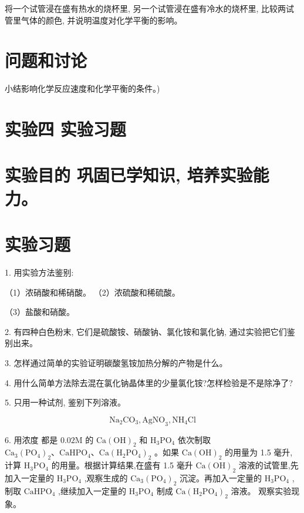 \documentclass[10pt]{article}
\begin{document}
将一个试管浸在盛有热水的烧杯里, 另一个试管浸在盛有冷水的烧杯里, 比较两试管里气体的颜色, 并说明温度对化学平衡的影响。

\section*{问题和讨论}

小结影响化学反应速度和化学平衡的条件。)

\section*{实验四 实验习题}

\section*{实验目的 巩固已学知识, 培养实验能力。}

\section*{实验习题}

1. 用实验方法鉴别:

（1）浓硝酸和稀硝酸。 （2）浓硫酸和稀硫酸。

（3）盐酸和硝酸。

2. 有四种白色粉末, 它们是硫酸铵、硝酸钠、氯化铵和氯化钠, 通过实验把它们鉴别出来。

3. 怎样通过简单的实验证明碳酸氢铵加热分解的产物是什么。

4. 用什么简单方法除去混在氯化钠晶体里的少量氯化铵?怎样检验是不是除净了?

5. 只用一种试剂, 鉴别下列溶液。

\[
{\mathrm{{Na}}}_{2}{\mathrm{{CO}}}_{3},{\mathrm{{AgNO}}}_{3},{\mathrm{{NH}}}_{4}\mathrm{{Cl}}
\]

6. 用浓度 都是 \({0.02}\mathrm{M}\) 的 \(\mathrm{{Ca}}{\left( \mathrm{{OH}}\right) }_{2}\) 和 \({\mathrm{H}}_{3}{\mathrm{{PO}}}_{4}\) 依次制取 \({\mathrm{{Ca}}}_{3}{\left( {\mathrm{{PO}}}_{4}\right) }_{2}\text{、}{\mathrm{{CaHPO}}}_{4}\text{、}\mathrm{{Ca}}{\left( {\mathrm{H}}_{2}{\mathrm{{PO}}}_{4}\right) }_{2}\) 。如果 \(\mathrm{{Ca}}{\left( \mathrm{{OH}}\right) }_{2}\) 的用量为 1.5 毫升,计算 \({\mathrm{H}}_{3}{\mathrm{{PO}}}_{4}\) 的用量。根据计算结果,在盛有 1.5 毫升 \(\mathrm{{Ca}}{\left( \mathrm{{OH}}\right) }_{2}\) 溶液的试管里,先加入一定量的 \({\mathrm{H}}_{3}{\mathrm{{PO}}}_{4}\) ,观察生成的 \({\mathrm{{Ca}}}_{3}{\left( {\mathrm{{PO}}}_{4}\right) }_{2}\) 沉淀。再加入一定量的 \({\mathrm{H}}_{3}{\mathrm{{PO}}}_{4}\) ,制取 \({\mathrm{{CaHPO}}}_{4}\) ,继续加入一定量的 \({\mathrm{H}}_{3}{\mathrm{{PO}}}_{4}\) 制成 \(\mathrm{{Ca}}{\left( {\mathrm{H}}_{2}{\mathrm{{PO}}}_{4}\right) }_{2}\) 溶液。 观察实验现象。
\end{document}
